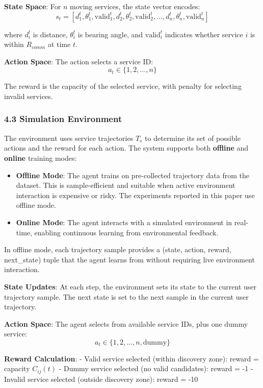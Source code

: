 \textbf{State Space}: For \(n\) moving services, the state vector
encodes:
\[s_t = [d_1^t, \theta_1^t, \text{valid}_1^t, d_2^t, \theta_2^t, \text{valid}_2^t, ..., d_n^t, \theta_n^t, \text{valid}_n^t]\]

where \(d_i^t\) is distance, \(\theta_i^t\) is bearing angle, and
\(\text{valid}_i^t\) indicates whether service \(i\) is within
\(R_{comm}\) at time \(t\).

\textbf{Action Space}: The action selects a service ID:
\[a_t \in \{1, 2, ..., n\}\]

The reward is the capacity of the selected service, with penalty for
selecting invalid services.

\hypertarget{simulation-environment}{%
	\subsubsection{4.3 Simulation
		Environment}\label{simulation-environment}}

The environment uses service trajectories \(T_s\) to determine its set
of possible actions and the reward for each action. The system supports
both \textbf{offline} and \textbf{online} training modes:

\begin{itemize}
	\item
	      \textbf{Offline Mode}: The agent trains on pre-collected trajectory
	      data from the dataset. This is sample-efficient and suitable when
	      active environment interaction is expensive or risky. The experiments
	      reported in this paper use offline mode.
	\item
	      \textbf{Online Mode}: The agent interacts with a simulated environment
	      in real-time, enabling continuous learning from environmental
	      feedback.
\end{itemize}

In offline mode, each trajectory sample provides a (state, action,
reward, next\_state) tuple that the agent learns from without requiring
live environment interaction.

\textbf{State Updates}: At each step, the environment sets its state to
the current user trajectory sample. The next state is set to the next
sample in the current user trajectory.

\textbf{Action Space}: The agent selects from available service IDs,
plus one dummy service: \[a_t \in \{1, 2, ..., n, \text{dummy}\}\]

\textbf{Reward Calculation}: - Valid service selected (within discovery
zone): reward = capacity \(C_{ij}(t)\) - Dummy service selected (no
valid candidates): reward = -1 - Invalid service selected (outside
discovery zone): reward = -10

